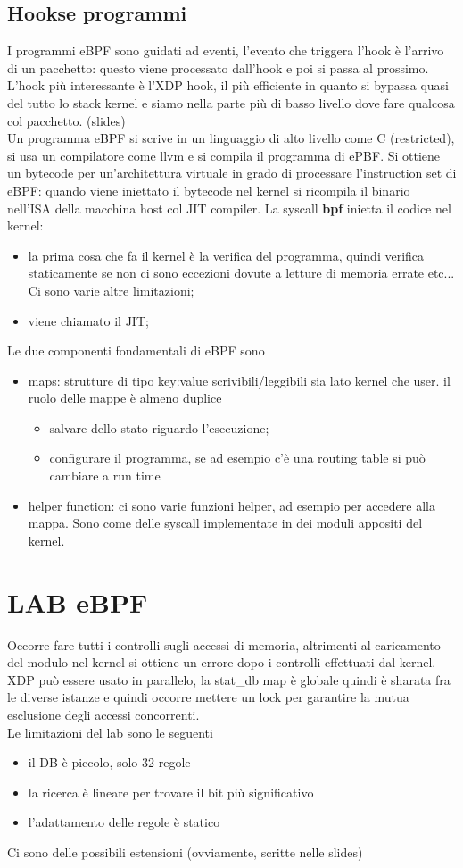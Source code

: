 \documentclass[12pt, oneside]{extbook} %
\begin{document}
\subsection{Hookse  programmi}
I programmi eBPF sono guidati ad eventi, l'evento che triggera l'hook è l'arrivo di un pacchetto: questo viene processato dall'hook e poi si passa al prossimo. L'hook più interessante è l'XDP hook, il più efficiente in quanto si bypassa quasi del tutto lo stack kernel e siamo nella parte più di basso livello dove fare qualcosa col pacchetto. (slides)\\ Un programma eBPF si scrive in un linguaggio di alto livello come C (restricted), si usa un compilatore come llvm e si compila il programma di ePBF. Si ottiene un bytecode per un'architettura virtuale in grado di processare l'instruction set di eBPF: quando viene iniettato il bytecode nel kernel si ricompila il binario nell'ISA della macchina host col JIT compiler. La syscall \textbf{bpf} inietta il codice nel kernel:
\begin{itemize}
\item la prima cosa che fa il kernel è la verifica del programma, quindi verifica staticamente se non ci sono eccezioni dovute a letture di memoria errate etc... Ci sono varie altre limitazioni; 
\item viene chiamato il JIT;
\end{itemize}
Le due componenti fondamentali di eBPF sono
\begin{itemize}
\item maps: strutture di tipo key:value scrivibili/leggibili sia lato kernel che user. il ruolo delle mappe è almeno duplice
\begin{itemize}
\item salvare dello stato riguardo l'esecuzione;
\item configurare il programma, se ad esempio c'è una routing table si può cambiare a run time
\end{itemize}
\item helper function: ci sono varie funzioni helper, ad esempio per accedere alla mappa. Sono come delle syscall implementate in dei moduli appositi del kernel.
\end{itemize}
\section*{LAB eBPF}
Occorre fare tutti i controlli sugli accessi di memoria, altrimenti al caricamento del modulo nel kernel si ottiene un errore dopo i controlli effettuati dal kernel. XDP può essere usato in parallelo, la stat\_db map è globale quindi è sharata fra le diverse istanze e quindi occorre mettere un lock per garantire la mutua esclusione degli accessi concorrenti.\\ Le limitazioni del lab sono le seguenti
\begin{itemize}
\item il DB è piccolo, solo 32 regole
\item la ricerca è lineare per trovare il bit più significativo
\item l'adattamento delle regole è statico
\end{itemize}
Ci sono delle possibili estensioni (ovviamente, scritte nelle slides)
\end{document}
